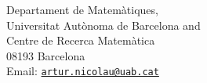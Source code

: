 \documentclass[a4paper,12pt]{article}
\theoremstyle{definition}
\numberwithin{equation}{section}
\begin{document}
\vspace{2cm} %
\noindent
Departament de Matem\`atiques, 
\\Universitat Aut\`onoma de Barcelona and \\
Centre de Recerca Matem\`atica \\
08193 Barcelona\\
Email: \href{mailto:artur.nicolau@uab.cat}{\texttt{artur.nicolau@uab.cat}}
\end{document}
